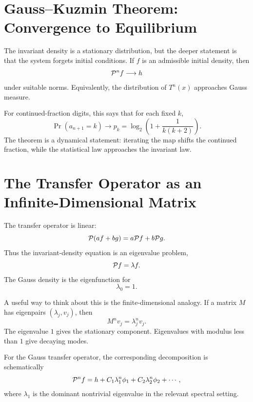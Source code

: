 \documentclass[a4paper]{article}
\begin{document}
\section{Gauss--Kuzmin Theorem: Convergence to Equilibrium}
The invariant density is a stationary distribution, but the deeper statement is that the system forgets initial conditions.
If $f$ is an admissible initial density, then
\begin{equation}
 \mathcal{P}^n f\longrightarrow h
\end{equation}
under suitable norms. Equivalently, the distribution of $T^n(x)$ approaches Gauss measure.

For continued-fraction digits, this says that for each fixed $k$,
\begin{equation}
 \Pr(a_{n+1}=k)\longrightarrow p_k
 =\log_2\left(1+\frac1{k(k+2)}\right).
\end{equation}
The theorem is a dynamical statement: iterating the map shifts the continued fraction, while the statistical law approaches the invariant law.

\section{The Transfer Operator as an Infinite-Dimensional Matrix}
The transfer operator is linear:
\begin{equation}
 \mathcal{P}(af+bg)=a\mathcal{P} f+b\mathcal{P} g.
\end{equation}
Thus the invariant-density equation is an eigenvalue problem,
\begin{equation}
 \mathcal{P} f=\lambda f.
\end{equation}
The Gauss density is the eigenfunction for
\begin{equation}
 \lambda_0=1.
\end{equation}

A useful way to think about this is the finite-dimensional analogy. If a matrix $M$ has eigenpairs $(\lambda_j,v_j)$, then
\begin{equation}
 M^n v_j=\lambda_j^n v_j.
\end{equation}
The eigenvalue $1$ gives the stationary component. Eigenvalues with modulus less than $1$ give decaying modes.

For the Gauss transfer operator, the corresponding decomposition is schematically
\begin{equation}
 \mathcal{P}^n f
 =h+C_1\lambda_1^n\phi_1+C_2\lambda_2^n\phi_2+\cdots,
\end{equation}
where $\lambda_1$ is the dominant nontrivial eigenvalue in the relevant spectral setting.
\end{document}

